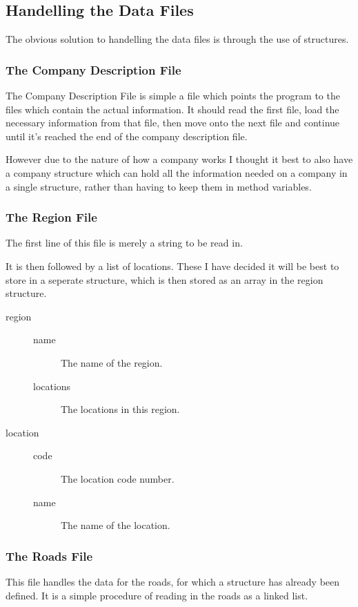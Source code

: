 \documentclass[10pt,letterpaper]{article}
\begin{document}
    \subsection{Handelling the Data Files}
      The obvious solution to handelling the data files is through the use of structures.
      
      \subsubsection{The Company Description File}
	The Company Description File is simple a file which points the program to the files which contain the actual information. It should read the first file, load the necessary information from that file, then move onto the next file and continue until it's reached the end of the company description file.
	
	However due to the nature of how a company works I thought it best to also have a company structure which can hold all the information needed on a company in a single structure, rather than having to keep them in method variables.
      
      \subsubsection{The Region File}
	The first line of this file is merely a string to be read in.
	
	It is then followed by a list of locations. These I have decided it will be best to store in a seperate structure, which is then stored as an array in the region structure.
	
	\begin{description}
	  \item[region]\hfill
	    \begin{description}
	      \item[name] The name of the region.
	      \item[locations] The locations in this region.
	    \end{description}
	  \item[location]\hfill
	    \begin{description}
	      \item[code] The location code number.
	      \item[name] The name of the location.
	    \end{description}
	\end{description}
      
      \subsubsection{The Roads File}
	This file handles the data for the roads, for which a structure has already been defined. It is a simple procedure of reading in the roads as a linked list.
	
\end{document}
